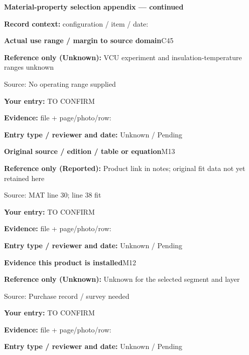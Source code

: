 \documentclass[11pt]{article}
\begin{document}
\clearpage
{\large\bfseries Material-property selection appendix --- continued}\par
\textbf{Record context:} configuration / item / date: \hrulefill\par
\par\noindent\begin{minipage}{\textwidth}\small
{\color{navy}\bfseries Actual use range / margin to source domain}\hfill C45\par
\colorbox{pale}{\parbox{\dimexpr\linewidth-2\fboxsep\relax}{
\textbf{Reference only (Unknown):} VCU experiment and insulation-temperature ranges unknown\par
{\footnotesize Source: No operating range supplied}}}\par
\textbf{Your entry:} {\color{muted}TO CONFIRM}\enspace\hrulefill\par
{\footnotesize\textbf{Evidence:} file + page/photo/row: \hrulefill\par
\textbf{Entry type / reviewer and date:} Unknown / Pending\par
}\end{minipage}\par\vspace{5pt}
\par\noindent\begin{minipage}{\textwidth}\small
{\color{navy}\bfseries Original source / edition / table or equation}\hfill M13\par
\colorbox{pale}{\parbox{\dimexpr\linewidth-2\fboxsep\relax}{
\textbf{Reference only (Reported):} Product link in notes; original fit data not yet retained here\par
{\footnotesize Source: MAT line 30; line 38 fit}}}\par
\textbf{Your entry:} {\color{muted}TO CONFIRM}\enspace\hrulefill\par
{\footnotesize\textbf{Evidence:} file + page/photo/row: \hrulefill\par
\textbf{Entry type / reviewer and date:} Unknown / Pending\par
}\end{minipage}\par\vspace{5pt}
\par\noindent\begin{minipage}{\textwidth}\small
{\color{navy}\bfseries Evidence this product is installed}\hfill M12\par
\colorbox{pale}{\parbox{\dimexpr\linewidth-2\fboxsep\relax}{
\textbf{Reference only (Unknown):} Unknown for the selected segment and layer\par
{\footnotesize Source: Purchase record / survey needed}}}\par
\textbf{Your entry:} {\color{muted}TO CONFIRM}\enspace\hrulefill\par
{\footnotesize\textbf{Evidence:} file + page/photo/row: \hrulefill\par
\textbf{Entry type / reviewer and date:} Unknown / Pending\par
}\end{minipage}\par\vspace{5pt}
\end{document}
